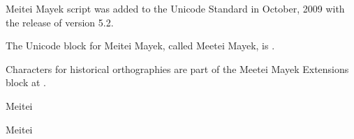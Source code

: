 Meitei Mayek script was added to the Unicode Standard in October, 2009 with the release of version 5.2.

The Unicode block for Meitei Mayek, called Meetei Mayek, is .

Characters for historical orthographies are part of the Meetei Mayek Extensions block at .

\begin{scriptexample}[]{Meitei}
\end{scriptexample}

\begin{scriptexample}[]{Meitei}
\end{scriptexample}








